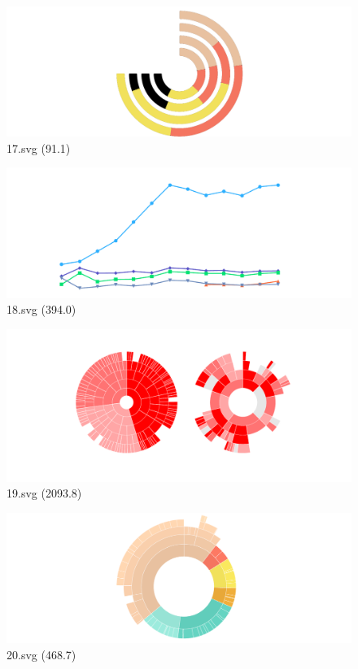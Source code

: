 \documentclass[journal]{IEEEtran}
\begin{document}
\begin{figure}[!htbp]
\centering
\begin{minipage}{0.233\columnwidth}
\centering
\includegraphics[width=\textwidth]{Train_set/17.pdf}
{17.svg (91.1)}
\end{minipage}
\hfill
\begin{minipage}{0.233\columnwidth}
\centering
\includegraphics[width=\textwidth]{Train_set/18.pdf}
{18.svg (394.0)}
\end{minipage}
\hfill
\begin{minipage}{0.233\columnwidth}
\centering
\includegraphics[width=\textwidth]{Train_set/19.pdf}
{19.svg (2093.8)}
\end{minipage}
\hfill
\begin{minipage}{0.233\columnwidth}
\centering
\includegraphics[width=\textwidth]{Train_set/20.pdf}
{20.svg (468.7)}
\end{minipage}
\end{figure}
\end{document}

